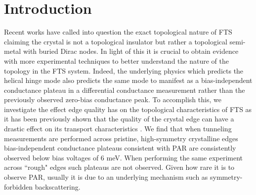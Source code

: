\section{Introduction}
Recent works have called into question the exact topological nature of \ac{FTS} claiming the crystal is not a topological insulator but rather a topological semi-metal with buried Dirac nodes\cite{Borisenko2020}. In light of this it is crucial to obtain evidence with more experimental techniques to better understand the nature of the topology in the \ac{FTS} system. Indeed, the underlying physics which predicts the helical hinge mode also predicts the same mode to manifest as a bias-independent conductance plateau in a differential conductance measurement rather than the previously observed zero-bias conductance peak\cite{DasSarma2018, Gray2019}. To accomplish this, we investigate the effect edge quality has on the topological characteristics of \ac{FTS} as it has been previously shown that the quality of the crystal edge can have a drastic effect on its transport characteristics \cite{Young2014}. We find that when tunneling measurements are performed across pristine, high-symmetry crystalline edges bias-independent conductance plateaus consistent with \acl{PAR} are consistently observed below bias voltages of 6 meV. When performing the same experiment across ``rough" edges such plateaus are not observed. Given how rare it is to observe \ac{PAR}, usually it is due to an underlying mechanism such as symmetry-forbidden backscattering.\cite{Lee2019} 

